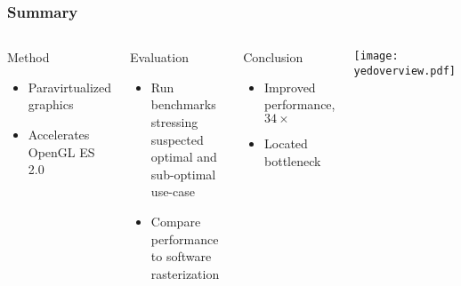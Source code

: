 \begin{frame}
  \frametitle{Summary}

  \begin{columns}

  \begin{block}{Method}
    \begin{itemize}
    \item Paravirtualized graphics
    \item Accelerates OpenGL ES 2.0
    \end{itemize}
  \end{block}

  \begin{block}{Evaluation}
    \begin{itemize}
    \item Run benchmarks stressing suspected optimal and sub-optimal use-case
    \item Compare performance to software rasterization
    \end{itemize}
  \end{block}

  \begin{block}{Conclusion}
    \begin{itemize}
    \item Improved performance, $34\times$
    \item Located bottleneck
    \end{itemize}
  \end{block}


  \begin{center}
    \texttt{[image: yedoverview.pdf]}
  \end{center}

\end{columns}

\end{frame}
